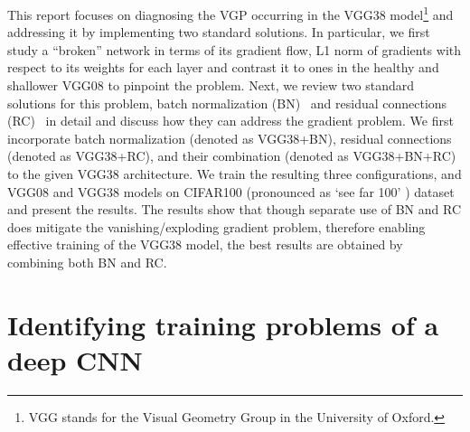 \documentclass{article}
\begin{document}
This report focuses on diagnosing the VGP occurring in the VGG38 model\footnote{VGG stands for the Visual Geometry Group in the University of Oxford.} and addressing it by implementing two standard solutions.
In particular, we first study a ``broken'' network in terms of its gradient flow, L1 norm of gradients with respect to its weights for each layer and contrast it to ones in the healthy and shallower VGG08 to pinpoint the problem.
Next, we review two standard solutions for this problem,  batch normalization (BN)~\cite{ioffe2015batch} and residual connections (RC)~\cite{he2016deep} in detail and discuss how they can address the gradient problem.
We first incorporate batch normalization (denoted as VGG38+BN), residual connections (denoted as VGG38+RC),  and their combination (denoted as VGG38+BN+RC) to the given VGG38 architecture.
We train the resulting three configurations, and VGG08 and VGG38 models on CIFAR100 (pronounced as `see far 100' ) dataset and present the results.
The results show that though separate use of BN and RC does mitigate the vanishing/exploding gradient problem, therefore enabling effective training of the VGG38 model, the best results are obtained by combining both BN and RC.

%


\section{Identifying training problems of a deep CNN}
\label{sec:task1}
\end{document}
